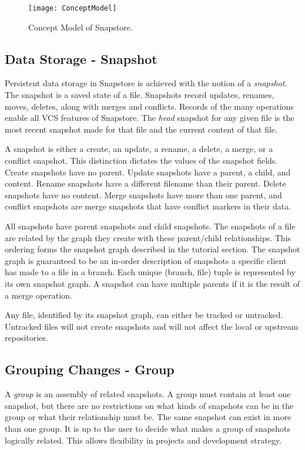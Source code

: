 \begin{figure}
\texttt{[image: ConceptModel]}
\caption{Concept Model of Snapstore.}
\label{arm:fig1}
\end{figure}

\subsection{Data Storage - Snapshot}

Persistent data storage in Snapstore is achieved with the notion of a \textit{snapshot}. The snapshot is a saved state of a file. Snapshots record updates, renames, moves, deletes, along with merges and conflicts. Records of the many operations enable all VCS features of Snapstore. The \textit{head} snapshot for any given file is the most recent snapshot made for that file and the current content of that file. 

A snapshot is either a create, an update, a rename, a delete, a merge, or a conflict snapshot. This distinction dictates the values of the snapshot fields. Create snapshots have no parent. Update snapshots have a parent, a child, and content. Rename snapshots have a different filename than their parent. Delete snapshots have no content. Merge snapshots have more than one parent, and conflict snapshots are merge snapshots that have conflict markers in their data.

All snapshots have parent snapshots and child snapshots. The snapshots of a file are related by the graph they create with these parent/child relationships. This ordering forms the snapshot graph described in the tutorial section. The snapshot graph is guaranteed to be an in-order description of snapshots a specific client has made to a file in a branch. Each unique (branch, file) tuple is represented by its own snapshot graph. A snapshot can have multiple parents if it is the result of a merge operation.

Any file, identified by its snapshot graph, can either be tracked or untracked. Untracked files will not create snapshots and will not affect the local or upstream repositories.

\subsection{Grouping Changes - Group}

A \textit{group} is an assembly of related snapshots. A group must contain at least one snapshot, but there are no restrictions on what kinds of snapshots can be in the group or what their relationship must be. The same snapshot can exist in more than one group. It is up to the user to decide what makes a group of snapshots logically related. This allows flexibility in projects and development strategy.

